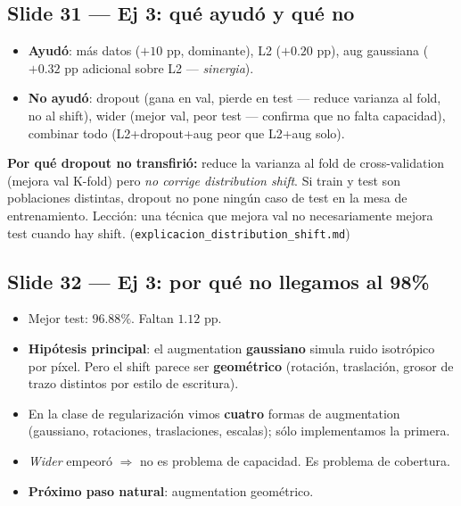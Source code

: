 \documentclass[11pt,a4paper]{article}
\newcommand{\nref}[1]{\textcolor{muted}{\small(\texttt{#1})}}
\begin{document}
\subsection{Slide 31 — Ej 3: qué ayudó y qué no}

\begin{decir}
\begin{itemize}[leftmargin=*,topsep=0pt]
  \item \textbf{Ayudó}: más datos ($+10$ pp, dominante), L2 ($+0.20$ pp),
        aug gaussiana ($+0.32$ pp adicional sobre L2 — \emph{sinergia}).
  \item \textbf{No ayudó}: dropout (gana en val, pierde en test — reduce
        varianza al fold, no al shift), wider (mejor val, peor test —
        confirma que no falta capacidad), combinar todo (L2+dropout+aug peor
        que L2+aug solo).
\end{itemize}
\end{decir}

\begin{nota}
\textbf{Por qué dropout no transfirió:} reduce la varianza al fold de
cross-validation (mejora val K-fold) pero \emph{no corrige distribution shift}.
Si train y test son poblaciones distintas, dropout no pone ningún caso de test
en la mesa de entrenamiento. Lección: una técnica que mejora val no
necesariamente mejora test cuando hay shift.
\nref{explicacion\_distribution\_shift.md}
\end{nota}

\subsection{Slide 32 — Ej 3: por qué no llegamos al 98\%}

\begin{decir}
\begin{itemize}[leftmargin=*,topsep=0pt]
  \item Mejor test: $96.88\%$. Faltan $1.12$ pp.
  \item \textbf{Hipótesis principal}: el augmentation \textbf{gaussiano} simula
        ruido isotrópico por píxel. Pero el shift parece ser \textbf{geométrico}
        (rotación, traslación, grosor de trazo distintos por estilo de escritura).
  \item En la clase de regularización vimos \textbf{cuatro} formas de
        augmentation (gaussiano, rotaciones, traslaciones, escalas); sólo
        implementamos la primera.
  \item \emph{Wider} empeoró $\Rightarrow$ no es problema de capacidad. Es
        problema de cobertura.
  \item \textbf{Próximo paso natural}: augmentation geométrico.
\end{itemize}
\end{decir}
\end{document}
